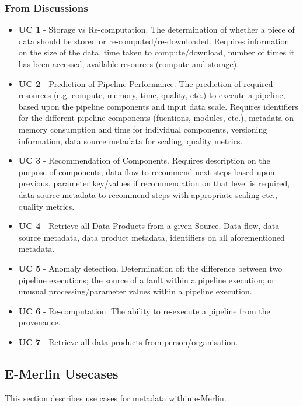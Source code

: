 \subsubsection{From Discussions}
\begin{itemize}[label={}]
    \item {\bf UC 1} - Storage vs Re-computation. The determination of whether a piece of data should be stored or re-computed/re-downloaded. Requires information on the size of the data, time taken to compute/download, number of times it has been accessed, available resources (compute and storage).
    \item {\bf UC 2} - Prediction of Pipeline Performance. The prediction of required resources (e.g. compute, memory, time, quality, etc.) to execute a pipeline, based upon the pipeline components and input data scale. Requires identifiers for the different pipeline components (fucntions, modules, etc.), metadata on memory consumption and time for individual components, versioning information, data source metadata for scaling, quality metrics. 
    \item {\bf UC 3} - Recommendation of Components. Requires description on the purpose of components, data flow to recommend next steps based upon previous, parameter key/values if recommendation on that level is required, data source metadata to recommend steps with appropriate scaling etc., quality metrics.  
    \item {\bf UC 4} - Retrieve all Data Products from a given Source. Data flow, data source metadata, data product metadata, identifiers on all aforementioned metadata. 
    \item {\bf UC 5} - Anomaly detection. Determination of: the difference between two pipeline executions; the source of a fault within a pipeline execution; or unusual processing/parameter values within a pipeline execution.
    \item {\bf UC 6} - Re-computation. The ability to re-execute a pipeline from the provenance.
    \item {\bf UC 7} - Retrieve all data products from person/organisation.
\end{itemize}

\subsection{E-Merlin Usecases}\label{sec:reqs}

This section describes use cases for metadata within e-Merlin.

